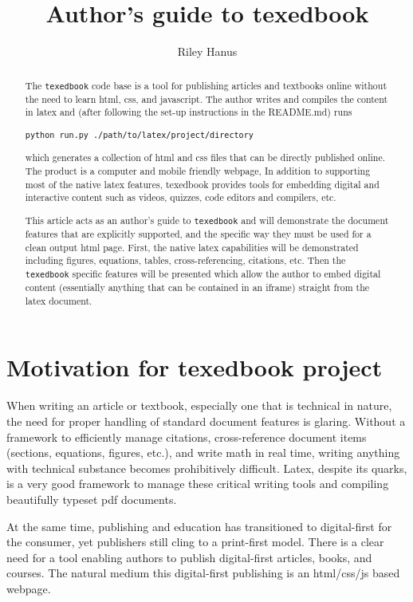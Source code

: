 \documentclass{article}
\title{Author's guide to texedbook}
\author{Riley Hanus}
\begin{document}
 
\maketitle

\begin{abstract}
\noindent The \verb'texedbook' code base is a tool for publishing articles and textbooks online without the need to learn html, css, and javascript. The author writes and compiles the content in latex and (after following the set-up instructions in the README.md) runs 
\begin{verbatim}
python run.py ./path/to/latex/project/directory
\end{verbatim}
which generates a collection of html and css files that can be directly published online. The product is a computer and mobile friendly webpage,  In addition to supporting most of the native latex features, texedbook provides tools for embedding digital and interactive content such as videos, quizzes, code editors and compilers, etc. 

\noindent This article acts as an author's guide to \verb'texedbook' and will demonstrate the document features that are explicitly supported, and the specific way they must be used for a clean output html page.  First, the native latex capabilities will be demonstrated including figures, equations, tables, cross-referencing, citations, etc. Then the \verb'texedbook' specific features will be presented which allow the author to embed digital content (essentially anything that can be contained in an iframe) straight from the latex document. 
\end{abstract}

\section{Motivation for texedbook project}

When writing an article or textbook, especially one that is technical in nature, the need for proper handling of standard document features is glaring. Without a framework to efficiently manage citations, cross-reference document items (sections, equations, figures, etc.), and write math in real time, writing anything with technical substance becomes prohibitively difficult. Latex, despite its quarks, is a very good framework to manage these critical writing tools and compiling beautifully typeset pdf documents.

At the same time, publishing and education has transitioned to digital-first for the consumer, yet publishers still cling to a print-first model. There is a clear need for a tool enabling authors to publish digital-first articles, books, and courses. The natural medium this digital-first publishing is an html/css/js based webpage. 
\end{document}
